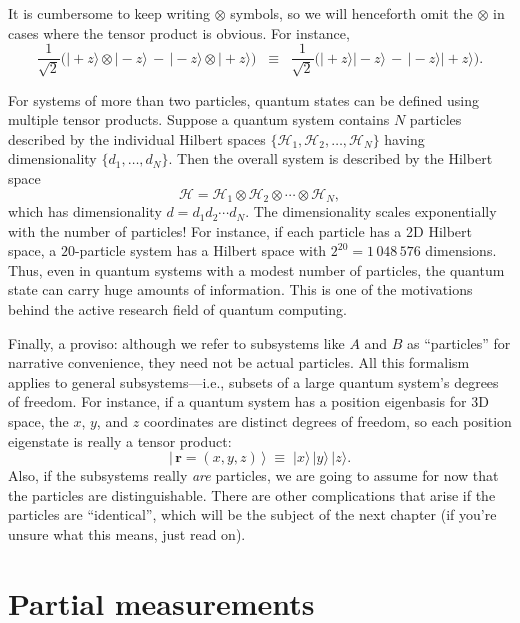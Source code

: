 \documentclass[pra,12pt]{revtex4}
\begin{document}
It is cumbersome to keep writing $\otimes$ symbols, so we will
henceforth omit the $\otimes$ in cases where the tensor product is
obvious.  For instance,
\begin{equation}
  \frac{1}{\sqrt{2}} \Big(|\!+\!z\rangle\otimes|\!-\!z\rangle \,-\, |\!-\!z\rangle\otimes|\!+\!z\rangle\Big) \;\;\equiv \;\; \frac{1}{\sqrt{2}} \Big(|\!+\!z\rangle|\!-\!z\rangle \,-\, |\!-\!z\rangle|\!+\!z\rangle\Big).
\end{equation}

For systems of more than two particles, quantum states can be defined
using multiple tensor products.  Suppose a quantum system contains $N$
particles described by the individual Hilbert spaces $\{\mathscr{H}_1,
\mathscr{H}_2, \dots, \mathscr{H}_N\}$ having dimensionality $\{d_1,
\dots, d_N\}$.  Then the overall system is described by the Hilbert
space
\begin{equation}
  \mathscr{H} = \mathscr{H}_1 \otimes \mathscr{H}_2 \otimes \cdots
  \otimes \mathscr{H}_N,
\end{equation}
which has dimensionality $d = d_1 d_2\cdots d_N$.  The dimensionality
scales exponentially with the number of particles!  For instance, if
each particle has a 2D Hilbert space, a $20$-particle system has a
Hilbert space with $2^{20} =1\,048\,576$ dimensions.  Thus, even in
quantum systems with a modest number of particles, the quantum state
can carry huge amounts of information.  This is one of the motivations
behind the active research field of quantum computing.

Finally, a proviso: although we refer to subsystems like $A$ and $B$
as ``particles'' for narrative convenience, they need not be actual
particles.  All this formalism applies to general subsystems---i.e.,
subsets of a large quantum system's degrees of freedom.  For instance,
if a quantum system has a position eigenbasis for 3D space, the $x$,
$y$, and $z$ coordinates are distinct degrees of freedom, so each
position eigenstate is really a tensor product:
\begin{equation*}
  |\,\mathbf{r} = (x,y,z)\,\rangle \;\equiv\; |x\rangle\, |y\rangle\, |z\rangle.
\end{equation*}
Also, if the subsystems really \textit{are} particles, we are going to
assume for now that the particles are distinguishable.  There are
other complications that arise if the particles are ``identical'',
which will be the subject of the next chapter (if you're unsure
what this means, just read on).

\section{Partial measurements}
\label{sec:partialmeasurements}
\end{document}
